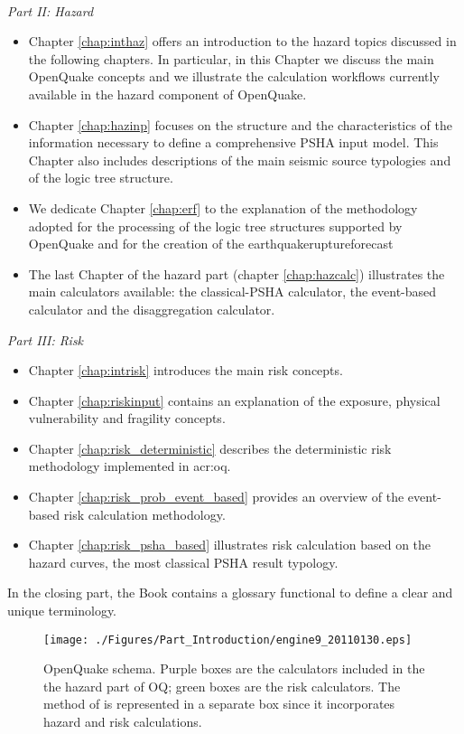 \hfill \\
\emph{Part II: Hazard}
\begin{itemize}
\item Chapter \ref{chap:inthaz} offers an introduction to the hazard 
topics discussed in the following chapters. In particular, in this 
Chapter we discuss the main OpenQuake concepts and we illustrate the 
calculation workflows currently available in the hazard component of 
OpenQuake.
\item Chapter \ref{chap:hazinp} focuses on the structure and the 
characteristics of the information necessary to define a 
comprehensive PSHA input model. This Chapter also includes
descriptions of the main seismic source typologies and of the logic 
tree structure.
\item We dedicate Chapter \ref{chap:erf} to the explanation of the
methodology adopted for the processing of the logic tree structures
supported by OpenQuake and for the creation of the 
\gls{earthquakeruptureforecast}
\item The last Chapter of the hazard part (chapter \ref{chap:hazcalc}) 
illustrates the main calculators available: the classical-PSHA calculator,
the event-based calculator and the disaggregation calculator. 
\end{itemize}
\emph{Part III: Risk}
\begin{itemize}
\item Chapter \ref{chap:intrisk} introduces the main risk concepts. 
\item Chapter \ref{chap:riskinput} contains an explanation of the exposure, 
physical vulnerability and fragility concepts.
\item Chapter \ref{chap:risk_deterministic} describes the deterministic risk 
methodology implemented in \gls{acr:oq}.
\item Chapter \ref{chap:risk_prob_event_based} provides an overview of the 
event-based risk calculation methodology.
\item Chapter \ref{chap:risk_psha_based} illustrates risk calculation based on 
the hazard curves, the most classical PSHA result typology.
\end{itemize}
%
In the closing part, the Book contains a glossary functional to define a 
clear and unique terminology.
%
\begin{landscape}
\begin{figure}
\texttt{[image: ./Figures/Part\_Introduction/engine9\_20110130.eps]}
\caption{OpenQuake schema. Purple boxes are the calculators included in the  
the hazard part of OQ; green boxes are the risk calculators. The method of 
\citet{wesson2009} is represented in a separate box since it incorporates 
hazard and risk calculations.}
\label{fig:openquake_schema}
\end{figure}
\end{landscape}
